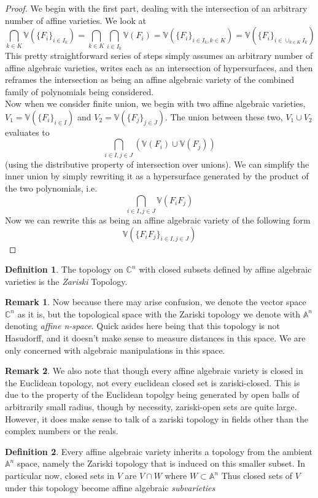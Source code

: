 \documentclass[12pt]{book}
\theoremstyle{definition}
\newtheorem*{definition}{Definition}
\newtheorem*{remark}{Remark}
\begin{document}
\begin{proof}
    We begin with the first part, dealing with the intersection of an arbitrary number of affine varieties. We look at $$\bigcap_{k \in K} \mathbb{V}(\{F_i\}_{i \in I_k}) = \bigcap_{k \in K} \bigcap_{i \in I_k} \mathbb{V}(F_i) = \mathbb{V}(\{F_i\}_{i \in I_k, k \in K}) = \mathbb{V}(\{F_i\}_{i \in \cup_{k \in K} I_k}) $$
    This pretty straightforward series of steps simply assumes an arbitrary number of affine algebraic varieties, writes each as an intersection of hypersurfaces, and then reframes the intersection as being an affine algebraic variety of the combined family of polynomials being considered.\\
    Now when we consider finite union, we begin with two affine algebraic varieties, $V_1 = \mathbb{V}(\{F_i\}_{i \in I})$ and $V_2 = \mathbb{V}(\{F_j\}_{j \in J})$. The union between these two, $V_1 \cup V_2$ evaluates to $$\bigcap_{i \in I, j \in J} (\mathbb{V}(F_i) \cup \mathbb{V}(F_j))$$ (using the distributive property of intersection over unions). We can simplify the inner union by simply rewriting it as a hypersurface generated by the product of the two polynomials, i.e. $$ \bigcap_{i \in I, j \in J} \mathbb{V}(F_iF_j)$$
    Now we can rewrite this as being an affine algebraic variety of the following form $$ \mathbb{V}(\{F_iF_j\}_{i \in I, j \in J})$$ 
\end{proof}

\begin{definition}
    The topology on $\mathbb{C}^n$ with closed subsets defined by affine algebraic varieties is the \textit{Zariski} Topology.
\end{definition}
\begin{remark}
    Now because there may arise confusion, we denote the vector space $\mathbb{C}^n$ as it is, but the topological space with the Zariski topology we denote with $\mathbb{A}^n$ denoting \textit{affine n-space}. Quick asides here being that this topology is not Hasudorff, and it doesn't make sense to measure distances in this space. We are only concerned with algebraic manipulations in this space.
\end{remark}
\begin{remark}
    We also note that though every affine algebraic variety is closed in the Euclidean topology, not every euclidean closed set is zariski-closed. This is due to the property of the Euclidean topolgy being generated by open balls of arbitrarily small radius, though by necessity, zariski-open sets are quite large. However, it does make sense to talk of a zariski topology in fields other than the complex numbers or the reals. 
\end{remark}
\begin{definition}
    Every affine algebraic variety inherits a topology from the ambient $\mathbb{A}^n$ space, namely the Zariski topology that is induced on this smaller subset. In particular now, closed sets in $V$ are $V \cap W$ where $W \subset \mathbb{A}^n$ Thus closed sets of $V$ under this topology become affine algebraic \textit{subvarieties}
\end{definition}
\end{document}
